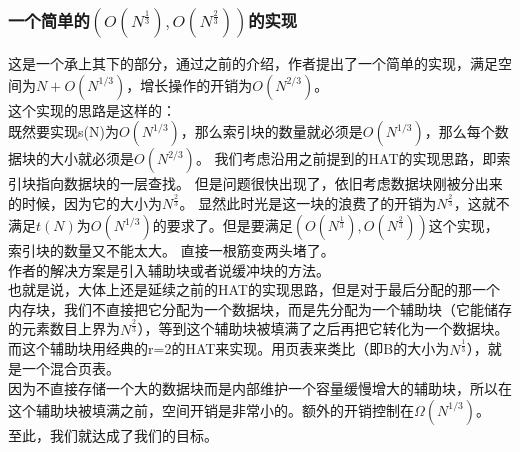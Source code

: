\documentclass[12pt,a4paper]{article}
\begin{document}
\subsubsection{一个简单的\texorpdfstring{$(O(N^{\frac{1}{3}}),O(N^{\frac{2}{3}}))$}{(O(N\^{}1/3), O(N\^{}2/3))}的实现}
这是一个承上其下的部分，通过之前的介绍，作者提出了一个简单的实现，满足空间为$N+O(N^{1/3})$，增长操作的开销为$O(N^{2/3})$。\\
这个实现的思路是这样的：\\
既然要实现s(N)为$O(N^{1/3})$，那么索引块的数量就必须是$O(N^{1/3})$，那么每个数据块的大小就必须是$O(N^{2/3})$。
我们考虑沿用之前提到的HAT的实现思路，即索引块指向数据块的一层查找。
但是问题很快出现了，依旧考虑数据块刚被分出来的时候，因为它的大小为$N^{\frac{2}{3}}$。
显然此时光是这一块的浪费了的开销为$N^{\frac{2}{3}}$，这就不满足$t(N)$为$O(N^{1/3})$的要求了。但是要满足{$(O(N^{\frac{1}{3}}),O(N^{\frac{2}{3}}))$}这个实现，索引块的数量又不能太大。
直接一根筋变两头堵了。\\
作者的解决方案是引入辅助块或者说缓冲块的方法。\\
也就是说，大体上还是延续之前的HAT的实现思路，但是对于最后分配的那一个内存块，我们不直接把它分配为一个数据块，而是先分配为一个辅助块（它能储存的元素数目上界为$N^{\frac{2}{3}}$），等到这个辅助块被填满了之后再把它转化为一个数据块。
而这个辅助块用经典的r=2的HAT来实现。用页表来类比（即B的大小为$N^{\frac{1}{3}}$），就是一个混合页表。\\
因为不直接存储一个大的数据块而是内部维护一个容量缓慢增大的辅助块，所以在这个辅助块被填满之前，空间开销是非常小的。额外的开销控制在$\Omega(N^{1/3})$。\\
至此，我们就达成了我们的目标。
\end{document}
